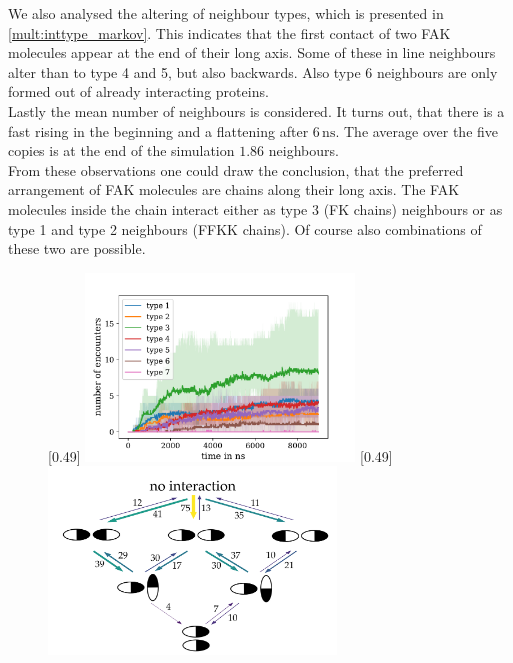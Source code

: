 We also analysed the altering of neighbour types, which is presented in \autoref{mult:inttype_markov}. This indicates that the first contact of two FAK molecules appear at the end of their long axis. Some of these in line neighbours alter than to type 4 and 5, but also backwards. Also type 6 neighbours are only formed out of already interacting proteins.\\
Lastly the mean number of neighbours is considered. It turns out, that there is a fast rising in the beginning and a flattening after $6\,\si{\nano\second}$. The average over the five copies is at the end of the simulation $1.86$ neighbours.\\
From these observations one could draw the conclusion, that the preferred arrangement of FAK molecules are chains along their long axis. The FAK molecules inside the chain interact either as type 3 (FK chains) neighbours or as type 1 and type 2 neighbours (FFKK chains). Of course also combinations of these two are possible.
%
%
%
\begin{figure}
	\subcaptionbox{\label{mult:inttype_vs_t}}[0.49\textwidth]{
		\includegraphics[height=5cm]{figures/results/multiple_typevstime}
	}\hfill%
	\subcaptionbox{\label{mult:inttype_markov}}[0.49\textwidth]{
		\includegraphics[height=5cm]{figures/results/markov}
	}%
\end{figure}
%
%
%
